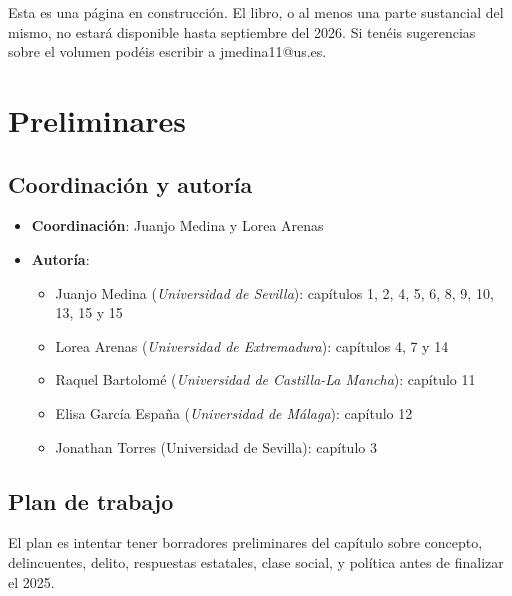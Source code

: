 \documentclass[
  spanish,
  letterpaper,
  DIV=11,
  numbers=noendperiod]{scrreprt}
\begin{document}
Esta es una página en construcción. El libro, o al menos una parte
sustancial del mismo, no estará disponible hasta septiembre del 2026. Si
tenéis sugerencias sobre el volumen podéis escribir a jmedina11@us.es.


\chapter*{Preliminares}\label{preliminares}


\section*{Coordinación y autoría}\label{coordinaciuxf3n-y-autoruxeda}


\begin{itemize}
\item
  \textbf{Coordinación}: Juanjo Medina y Lorea Arenas
\item
  \textbf{Autoría}:

  \begin{itemize}
  \item
    Juanjo Medina (\emph{Universidad de Sevilla}): capítulos 1, 2, 4, 5,
    6, 8, 9, 10, 13, 15 y 15
  \item
    Lorea Arenas (\emph{Universidad de Extremadura}): capítulos 4, 7 y
    14
  \item
    Raquel Bartolomé (\emph{Universidad de Castilla-La Mancha}):
    capítulo 11
  \item
    Elisa García España (\emph{Universidad de Málaga}): capítulo 12
  \item
    Jonathan Torres (Universidad de Sevilla): capítulo 3
  \end{itemize}
\end{itemize}

\section*{Plan de trabajo}\label{plan-de-trabajo}


El plan es intentar tener borradores preliminares del capítulo sobre
concepto, delincuentes, delito, respuestas estatales, clase social, y
política antes de finalizar el 2025.
\end{document}
